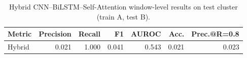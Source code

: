 \begin{table}[h]
  \centering
  \small
  \begin{tabular}{lrrrrrr}
    \toprule
    Metric & Precision & Recall & F1 & AUROC & Acc. & Prec.@R=0.8 \\
    \midrule
    Hybrid & 0.021 & 1.000 & 0.041 & 0.543 & 0.021 & 0.023 \\ 
    \bottomrule
  \end{tabular}
  \caption{Hybrid CNN–BiLSTM–Self-Attention window-level results on test cluster (train A, test B).}
  \label{tab:hybrid_results}
\end{table}